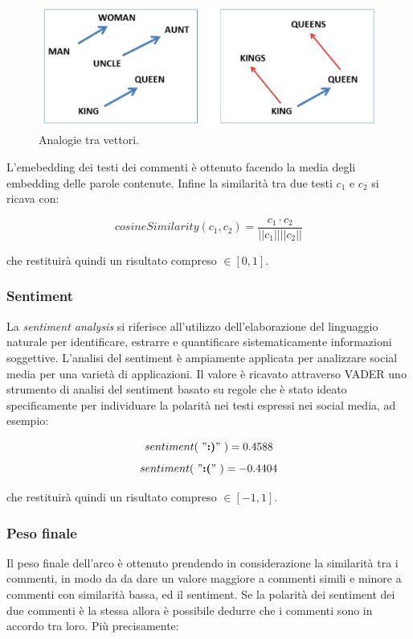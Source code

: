 \begin{figure}
    \includegraphics[width=\linewidth]{Immagini/king-queen.png}
    \caption{Analogie tra vettori.}
    \label{fig:analogy}
\end{figure}

L'emebedding dei testi dei commenti è ottenuto facendo la media degli embedding delle parole contenute. Infine la similarità tra due testi $c_1$ e $c_2$ si ricava con:

$$cosineSimilarity(c_1, c_2) = \frac{c_1 \cdot c_2}{||c_1|| ||c_2||}$$

che restituirà quindi un risultato compreso $\in [0, 1]$.

\subsubsection{Sentiment}
La \textit{sentiment analysis} si riferisce all'utilizzo dell'elaborazione del linguaggio naturale per identificare, estrarre e quantificare sistematicamente informazioni soggettive. L'analisi del sentiment è ampiamente applicata per analizzare social media per una varietà di applicazioni. Il valore è ricavato attraverso VADER \cite{hutto2014vader} uno strumento di analisi del sentiment basato su regole che è stato ideato specificamente per individuare la polarità nei testi espressi nei social media, ad esempio:

    $$sentiment(\ "\textbf{:)}" \ ) = 0.4588$$
    $$sentiment(\ "\textbf{:(}" \ ) = -0.4404$$

che restituirà quindi un risultato compreso $\in [-1, 1]$.

\subsubsection{Peso finale}
Il peso finale dell'arco è ottenuto prendendo in considerazione la similarità tra i commenti, in modo da da dare un valore maggiore a commenti simili e minore a commenti con similarità bassa, ed il sentiment. Se la polarità dei sentiment dei due commenti è la stessa allora è possibile dedurre che i commenti sono in accordo tra loro. Più precisamente:

